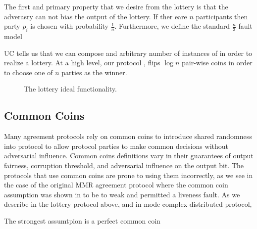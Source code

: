 The first and primary property that we desire from the lottery is that the adverasry can not bias the output of the lottery.
If ther eare $n$ participants then party $p_i$ is chosen with probability $\frac{1}{n}$.
Furthermore, we define the standard $\frac{n}{3}$ fault model 

UC tells us that we can compose and arbitrary number of instances of \Fflip in order to realize a lottery.
At a high level, our protocol , flips $\log n$ pair-wise coins in order to choose one of $n$ parties as the winner. 

\begin{figure}
\centering

\caption{The lottery ideal functionality.}
\label{fig:flotto}
\end{figure}


\subsection{Common Coins}
Many agreement protocols rely on common coins to introduce shared randomness into protocol to allow protocol parties to make common decisions without adversarial influence.
Common coins definitions vary in their guarantees of output fairness, corruption threshold, and adversarial influence on the output bit.
The protocols that use common coins are prone to using them incorrectly, as we see in the case of the original MMR agreement protocol where the common coin assumption was shown in \cite{formalbyz} to be to weak and permitted a liveness fault.
As we describe in the lottery protocol above, and in mode complex distributed protocol, 

The strongest assumtpion is a perfect common coin
